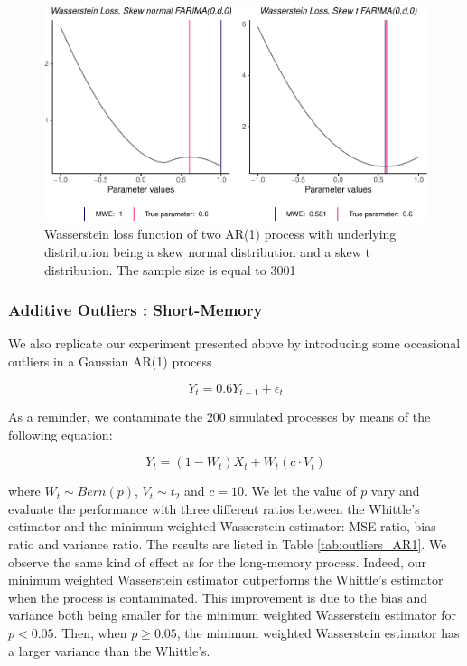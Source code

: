 \documentclass[
  11pt,
]{article}
\begin{document}
\begin{figure}

{\centering \includegraphics[width=0.75\linewidth]{Master_thesis_V5_files/figure-latex/AR1_loss-1} 

}

\caption{Wasserstein loss function of two AR(1) process with underlying distribution being a skew normal distribution and a skew t distribution. The sample size is equal to 3001}\label{fig:AR1_loss}
\end{figure}

\hypertarget{additive-outliers-short-memory}{%
\subsubsection{Additive Outliers :
Short-Memory}\label{additive-outliers-short-memory}}

We also replicate our experiment presented above by introducing some
occasional outliers in a Gaussian AR(1) process

\[Y_t = 0.6Y_{t-1} + \epsilon_t\]

As a reminder, we contaminate the \(200\) simulated processes by means
of the following equation:

\[Y_{t}=\left(1-W_{t}\right) X_{t}+W_{t}\left(c \cdot V_{t}\right)\]

where \(W_t \sim Bern(p)\), \(V_t \sim t_2\) and \(c = 10\). We let the
value of \(p\) vary and evaluate the performance with three different
ratios between the Whittle's estimator and the minimum weighted
Wasserstein estimator: MSE ratio, bias ratio and variance ratio. The
results are listed in Table \ref{tab:outliers_AR1}. We observe the same
kind of effect as for the long-memory process. Indeed, our minimum
weighted Wasserstein estimator outperforms the Whittle's estimator when
the process is contaminated. This improvement is due to the bias and
variance both being smaller for the minimum weighted Wasserstein
estimator for \(p <0.05\). Then, when \(p \geq 0.05\), the minimum
weighted Wasserstein estimator has a larger variance than the Whittle's.
\end{document}
